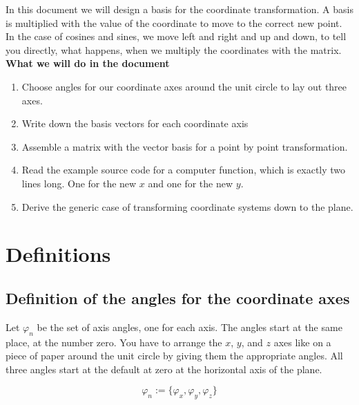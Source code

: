 \documentclass[a4paper]{article}
\begin{document}
In this document we will design a basis for the coordinate transformation. A
basis is multiplied with the value of the coordinate to move to the correct new point.\\
In the case of cosines and sines, we move left and right and up and down, to 
tell you directly, what happens, when we multiply the coordinates with the matrix.\\

\textbf{What we will do in the document}

\begin{enumerate}
\item Choose angles for our coordinate axes around the unit circle to lay out three axes.
\item Write down the basis vectors for each coordinate axis
\item Assemble a matrix with the vector basis for a point by point transformation.
\item Read the example source code for a computer function, which is exactly two lines long. One for the new $x$ and one for the new $y$.
\item Derive the generic case of transforming coordinate systems down to the plane.
\end{enumerate}

\section{Definitions}

\subsection{Definition of the angles for the coordinate axes}

 Let $\varphi_n$ be the set of axis angles, one for each axis. The angles start
at the same place, at the number zero. You have to arrange the $x$, $y$, and
$z$ axes like on a piece of paper around the unit circle by giving them the
appropriate angles. All three angles start at the default at zero at the horizontal axis of the plane.

\begin{displaymath}
\varphi_n := \{\varphi_x, \varphi_y, \varphi_z\}
\end{displaymath}
\end{document}
